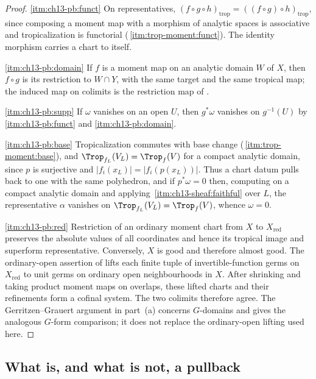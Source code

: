 \begin{proof}
\cref{itm:ch13-pb:funct} On representatives, $(f\circ g\circ h)_{\mathrm{trop}}
=((f\circ g)\circ h)_{\mathrm{trop}}$, since composing a moment map with a
morphism of analytic spaces is associative and tropicalization is functorial
(\,\cref{itm:trop-moment:funct}).  The identity
morphism carries a chart to itself.

\cref{itm:ch13-pb:domain} If $f$ is a moment map on an analytic domain $W$ of
$X$, then $f\circ g$ is its restriction to $W\cap Y$, with the same target
and the same tropical map; the induced map on colimits is the restriction map
of .

\cref{itm:ch13-pb:supp} If $\omega$ vanishes on an open $U$, then
$g^*\omega$ vanishes on $g^{-1}(U)$ by \cref{itm:ch13-pb:funct} and
\cref{itm:ch13-pb:domain}.

\cref{itm:ch13-pb:base} Tropicalization commutes with base change
(\,\cref{itm:trop-moment:base}), and
$\Trop_{f_L}(V_L)=\Trop_f(V)$ for a compact analytic domain, since $p$ is
surjective and $|f_i(x_L)|=|f_i(p(x_L))|$.  Thus a chart datum pulls back to
one with the same polyhedron, and if $p^*\omega=0$ then, computing on a
compact analytic domain and applying
\,\cref{itm:ch13-sheaf:faithful} over $L$, the
representative $\alpha$ vanishes on $\Trop_{f_L}(V_L)=\Trop_f(V)$, whence
$\omega=0$.

\cref{itm:ch13-pb:red} Restriction of an ordinary moment chart from $X$
to $X_{\mathrm{red}}$ preserves the absolute values of all coordinates and
hence its tropical image and superform representative.  Conversely, $X$
is good and therefore almost good.  The ordinary-open assertion of
\cite[Proposition~15.1.3(b) and the form variant immediately following
it]{CLD25} lifts each finite tuple of invertible-function germs on
$X_{\mathrm{red}}$ to unit germs on ordinary open neighbourhoods in $X$.
After shrinking and taking product moment maps on overlaps, these lifted
charts and their refinements form a cofinal system.  The two colimits
therefore agree.  The Gerritzen--Grauert argument in part~(a) concerns
$G$-domains and gives the analogous $G$-form comparison; it does not
replace the ordinary-open lifting used here.
\end{proof}

\subsection{What is, and what is not, a pullback}
\label{sec:ch13-what-is-pullback}

